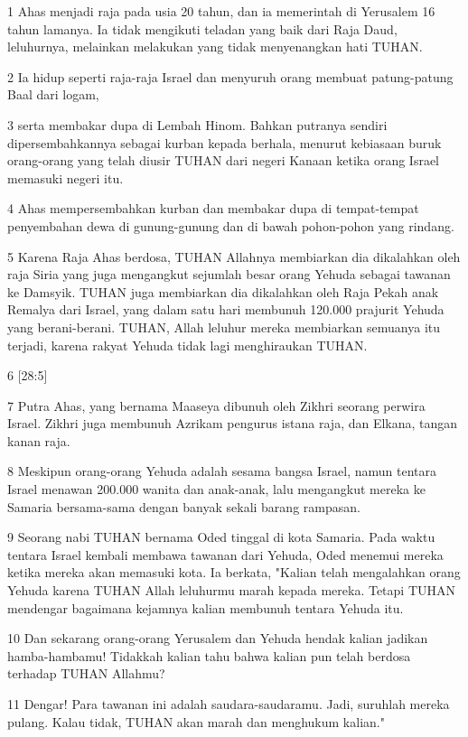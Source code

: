 \par 1 Ahas menjadi raja pada usia 20 tahun, dan ia memerintah di Yerusalem 16 tahun lamanya. Ia tidak mengikuti teladan yang baik dari Raja Daud, leluhurnya, melainkan melakukan yang tidak menyenangkan hati TUHAN.
\par 2 Ia hidup seperti raja-raja Israel dan menyuruh orang membuat patung-patung Baal dari logam,
\par 3 serta membakar dupa di Lembah Hinom. Bahkan putranya sendiri dipersembahkannya sebagai kurban kepada berhala, menurut kebiasaan buruk orang-orang yang telah diusir TUHAN dari negeri Kanaan ketika orang Israel memasuki negeri itu.
\par 4 Ahas mempersembahkan kurban dan membakar dupa di tempat-tempat penyembahan dewa di gunung-gunung dan di bawah pohon-pohon yang rindang.
\par 5 Karena Raja Ahas berdosa, TUHAN Allahnya membiarkan dia dikalahkan oleh raja Siria yang juga mengangkut sejumlah besar orang Yehuda sebagai tawanan ke Damsyik. TUHAN juga membiarkan dia dikalahkan oleh Raja Pekah anak Remalya dari Israel, yang dalam satu hari membunuh 120.000 prajurit Yehuda yang berani-berani. TUHAN, Allah leluhur mereka membiarkan semuanya itu terjadi, karena rakyat Yehuda tidak lagi menghiraukan TUHAN.
\par 6 [28:5]
\par 7 Putra Ahas, yang bernama Maaseya dibunuh oleh Zikhri seorang perwira Israel. Zikhri juga membunuh Azrikam pengurus istana raja, dan Elkana, tangan kanan raja.
\par 8 Meskipun orang-orang Yehuda adalah sesama bangsa Israel, namun tentara Israel menawan 200.000 wanita dan anak-anak, lalu mengangkut mereka ke Samaria bersama-sama dengan banyak sekali barang rampasan.
\par 9 Seorang nabi TUHAN bernama Oded tinggal di kota Samaria. Pada waktu tentara Israel kembali membawa tawanan dari Yehuda, Oded menemui mereka ketika mereka akan memasuki kota. Ia berkata, "Kalian telah mengalahkan orang Yehuda karena TUHAN Allah leluhurmu marah kepada mereka. Tetapi TUHAN mendengar bagaimana kejamnya kalian membunuh tentara Yehuda itu.
\par 10 Dan sekarang orang-orang Yerusalem dan Yehuda hendak kalian jadikan hamba-hambamu! Tidakkah kalian tahu bahwa kalian pun telah berdosa terhadap TUHAN Allahmu?
\par 11 Dengar! Para tawanan ini adalah saudara-saudaramu. Jadi, suruhlah mereka pulang. Kalau tidak, TUHAN akan marah dan menghukum kalian."
